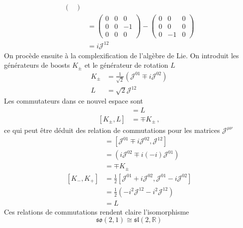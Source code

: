 \documentclass{article}
\numberwithin{equation}{section}
\theoremstyle{solution}
\begin{document}
\begin{align*}
\begin{pmatrix}
        \end{pmatrix}
        \\
        &= 
        \begin{pmatrix}
                0 & 0 & 0 \\
                0 & 0 & -1 \\
                0 & 0 & 0
        \end{pmatrix}
        -
        \begin{pmatrix}
                0 & 0 & 0 \\
                0 & 0 & 0 \\
                0 & -1 & 0
        \end{pmatrix}
        \\
        &= 
        i \mathcal{J}^{12}
\end{align*}
\endgroup
On procède ensuite à la complexification de l'algèbre de Lie. On introduit les générateurs de boosts $K_{\pm}$ et le 
générateur de rotation $L$
\begin{align*}
        K_{\pm} &= \frac{1}{\sqrt{2}}(\mathcal{J}^{01} \mp i \mathcal{J}^{02}) \\
        L &= \sqrt{2}\mathcal{J}^{12}
\end{align*}
Les commutateurs dans ce nouvel espace sont
\begin{align}
        [K_{-}, K_{+}] &= L \\
        [K_{\pm}, L] &= \mp K_{\pm} \, ,
\end{align}
ce qui peut être déduit des relation de commutations pour les matrices $\mathcal{J}^{\mu \nu}$
\begin{align*}
        [K_{\pm}, L] &= [\mathcal{J}^{01} \mp i \mathcal{J}^{02}, \mathcal{J}^{12}] \\
                     &= (i\mathcal{J}^{02} \mp i(-i)\mathcal{J}^{01}) \\
                     &= \mp K_{\pm} \\
        [K_{-}, K_{+}] &= \frac{1}{2}[\mathcal{J}^{01} + i \mathcal{J}^{02}, \mathcal{J}^{01} - i \mathcal{J}^{02}] \\
                &= \frac{1}{2}(-i^2\mathcal{J}^{12} - i^2\mathcal{J}^{12})\\ 
                &= L
\end{align*}
Ces relations de commutations rendent claire l'isomorphisme
\begin{equation}
        \mathfrak{so}(2, 1) \cong \mathfrak{sl}(2, \mathbb{R}) 
\end{equation} 
\end{document}
